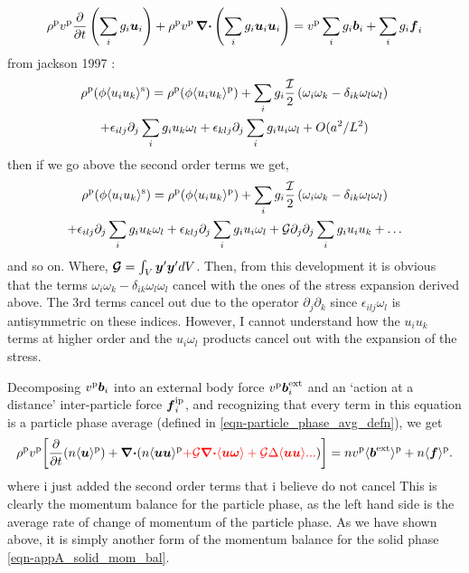 \documentclass[aip,pof,preprint]{report}
\newcommand{\te}[1]{\mbox{\boldmath $#1$}}
\newcommand{\be}{\begin{equation}}
\newcommand{\ee}{\end{equation}}
\newcommand{\Div}{\te{\nabla \cdot}}
\newcommand{\pder}[2]{\frac{\displaystyle\partial#1}{\displaystyle\partial#2}}
\newcommand{\avg}[1]{\langle #1 \rangle}
\newcommand{\subtext}[1]{\mbox{\scriptsize #1}}
\newcommand{\rhop}{\rho^{\subtext{p}}}
\newcommand{\vp}{v^{\subtext{p}}}
\newcommand{\fp}{\avg{\te{f}}^{\subtext{p}}}
\begin{document}
\be
	\rhop v^{\subtext{p}} \pder{}{t} \left( \sum_{i} g_i \te{u}_i \right) + \rhop v^{\subtext{p}} \, \Div \left( \sum_{i} g_i \te{u}_i \te{u}_i \right) = v^{\subtext{p}} \sum_{i} g_i \te{b}_i + \sum_{i} g_i \te{f}_i
\label{eqn-appA_part_mom_bal1}
\ee
{\color{red} from jackson 1997 : 
\begin{multline}
	\rhop (\phi \avg{u_i u_k}^{\subtext{s}})
	= 
	\rhop (\phi \avg{u_i u_k}^{\subtext{p}})
	+ \sum_i g_i\frac{\mathcal{I}}{2}\left(
		\omega_i\omega_k - \delta_{ik}\omega_l\omega_l
	\right)\\
	+ \epsilon_{ilj}\partial_j\sum_i g_i u_k  \omega_l
	+ \epsilon_{klj}\partial_j\sum_i g_i u_i  \omega_l
	+ O(a^2/L^2)	
\end{multline}
then if we go above the second order terms we get,
\begin{multline}
	\rhop (\phi \avg{u_i u_k}^{\subtext{s}})
	= 
	\rhop (\phi \avg{u_i u_k}^{\subtext{p}})
	+ \sum_i g_i\frac{\mathcal{I}}{2}\left(
		\omega_i\omega_k - \delta_{ik}\omega_l\omega_l
	\right)\\
	+ \epsilon_{ilj}\partial_j\sum_i g_i u_k  \omega_l
	+ \epsilon_{klj}\partial_j\sum_i g_i u_i  \omega_l
	+ \mathcal{G} \partial_j\partial_j \sum_i g_i u_i u_k
	+ \ldots
\end{multline}
and so on. 
Where, $\te{\mathcal{G}} = \int_V \te{y}'\te{y}'dV$. 
Then, from this development it is obvious that the terms $\omega_i\omega_k - \delta_{ik}\omega_l\omega_l$ cancel with the ones of the stress expansion derived above. 
The 3rd terms cancel out due to the operator $\partial_j\partial_k$ since $\epsilon_{ilj}\omega_l $ is antisymmetric on these indices. 
However, I cannot understand how the $u_i u_k$ terms at higher order and the $ u_i  \omega_l$ products cancel out with the expansion of the stress. 
}

Decomposing $\vp \te{b}_i$ into an external body force $\vp \te{b}_i^{\subtext{ext}}$ and an `action at a distance' inter-particle force $\te{f}_i^{\subtext{ip}}$, and recognizing that every term in this equation is a particle phase average (defined in \eqref{eqn-particle_phase_avg_defn}), we get
\be
	\rhop \vp \! \left[ \pder{}{t} (n \avg{\te{u}}^{\subtext{p}}) 
	+ \Div (n \avg{\te{u} \te{u}}^{\subtext{p}}  
	{\color{red}
	+\mathcal{G}\Div\avg{\te{u}\te{\omega}}
	+\mathcal{G}\Delta\avg{\te{u}\te{u}}...}
	) \right]  = n \vp \avg{\te{b}^{\subtext{ext}}}^{\subtext{p}} + n  \fp.
\label{eqn-appA_part_mom_bal}
\ee
{\color{red} where i just added the second order terms that i believe do not cancel}
This is clearly the momentum balance for the particle phase, as the left hand side is the average rate of change of momentum of the particle phase.  As we have shown above, it is simply another form of the momentum balance for the solid phase \eqref{eqn-appA_solid_mom_bal}.
\end{document}
